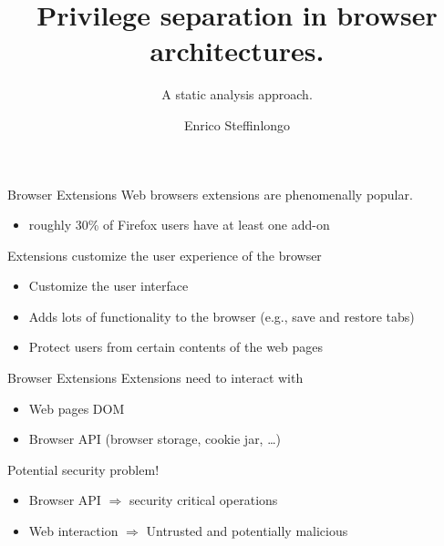 \documentclass[11pt]{beamer}
\author{Enrico Steffinlongo}
\title{Privilege separation in browser architectures.}
\subtitle{A static analysis approach.}
\institute[Universities Here and There] %
{
  Università Ca' Foscari - Computer science
}
\begin{document}
\begin{frame}
\titlepage
\end{frame}



\begin{frame}{Browser Extensions}
Web browsers extensions are phenomenally popular.
\begin{itemize}
\item roughly 30\% of Firefox users have at least one add-on
\end{itemize}
Extensions customize the user experience of the browser
\begin{itemize}
\item Customize the user interface
\item Adds lots of functionality to the browser (e.g., save and restore tabs)
\item Protect users from certain contents of the web pages 
\end{itemize}
\end{frame}

\begin{frame}{Browser Extensions}
Extensions need to interact with
\begin{itemize}
\item Web pages DOM
\item Browser API (browser storage, cookie jar, \dots)
\end{itemize}
Potential security problem!
\begin{itemize}
\item Browser API $\Rightarrow$ security critical operations\\
\item Web interaction $\Rightarrow$ Untrusted and potentially malicious\\
\end{itemize}
\end{frame}
\end{document}
